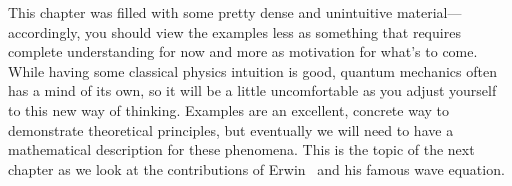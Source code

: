 This chapter was filled with some pretty dense and unintuitive material---accordingly, you should view the examples less as something that requires complete understanding for now and more as motivation for what's to come. While having some classical physics intuition is good, quantum mechanics often has a mind of its own, so it will be a little uncomfortable as you adjust yourself to this new way of thinking. Examples are an excellent, concrete way to demonstrate theoretical principles, but eventually we will need to have a mathematical description for these phenomena. This is the topic of the next chapter as we look at the contributions of Erwin \Sch\ and his famous wave equation.

%
